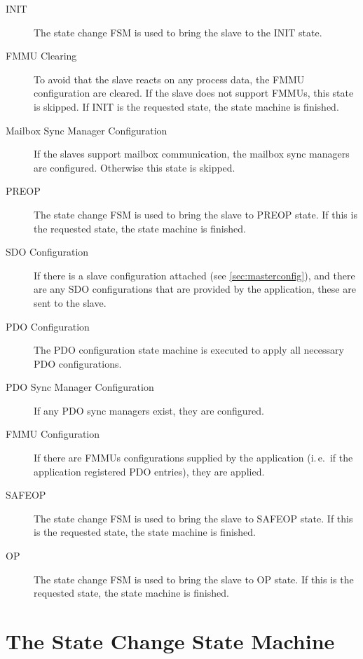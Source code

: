 \documentclass[a4paper,12pt,BCOR6mm,bibtotoc,idxtotoc]{scrbook}
\begin{document}
\begin{description}

\item[INIT] The state change FSM is used to bring the slave to the INIT state.

\item[FMMU Clearing] To avoid that the slave reacts on any process data, the
FMMU configuration are cleared. If the slave does not support FMMUs, this
state is skipped. If INIT is the requested state, the state machine is
finished.

\item[Mailbox Sync Manager Configuration] If the slaves support mailbox
communication, the mailbox sync managers are configured. Otherwise this state
is skipped.

\item[PREOP] The state change FSM is used to bring the slave to PREOP state.
If this is the requested state, the state machine is finished.

\item[SDO Configuration] If there is a slave configuration attached (see
\autoref{sec:masterconfig}), and there are any SDO configurations that are
provided by the application, these are sent to the slave.

\item[PDO Configuration] The PDO configuration state machine is executed to
apply all necessary PDO configurations.

\item[PDO Sync Manager Configuration] If any PDO sync managers exist, they are
configured.

\item[FMMU Configuration] If there are FMMUs configurations supplied by the
application (i.\,e.\ if the application registered PDO entries), they are
applied.

\item[SAFEOP] The state change FSM is used to bring the slave to SAFEOP state.
If this is the requested state, the state machine is finished.

\item[OP] The state change FSM is used to bring the slave to OP state.
If this is the requested state, the state machine is finished.

\end{description}


\section{The State Change State Machine}
\label{sec:fsm-change}
\end{document}
